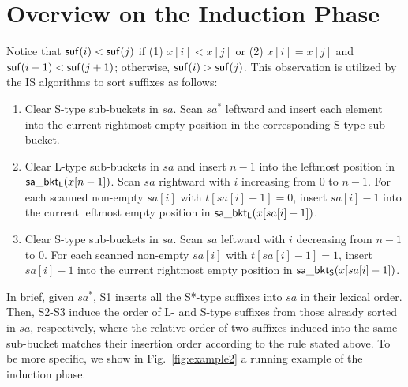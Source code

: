 \documentclass[10pt,journal,compsoc]{IEEEtran}
\begin{document}
\appendices
\section{Overview on the Induction Phase} \label{sec:appendix}

Notice that ${\sf suf}(i) < {\sf suf}(j)$ if (1) $x[i] < x[j]$ or (2) $x[i] = x[j]$ and ${\sf suf}(i + 1) < {\sf suf}(j + 1)$; otherwise, ${\sf suf}(i) > {\sf suf}(j)$. This observation is utilized by the IS algorithms to sort suffixes as follows:

\begin{enumerate}[S1]
	\item 
	Clear S-type sub-buckets in $sa$. Scan $sa^*$ leftward and insert each element into the current rightmost empty position in the corresponding S-type sub-bucket.
	
	\item 
	Clear L-type sub-buckets in $sa$ and insert $n - 1$ into the leftmost position in ${\sf sa\_bkt_L}(x[n - 1])$. Scan $sa$ rightward with $i$ increasing from $0$ to $n - 1$. For each scanned non-empty $sa[i]$ with $t[sa[i] - 1] = 0$, insert $sa[i] - 1$ into the current leftmost empty position in ${\sf sa\_bkt_L}(x[sa[i] - 1])$.
	
	\item
	Clear S-type sub-buckets in $sa$. Scan $sa$ leftward with $i$ decreasing from $n - 1$ to $0$. For each scanned non-empty $sa[i]$ with $t[sa[i] - 1] = 1$, insert $sa[i] - 1$ into the current rightmost empty position in ${\sf sa\_bkt_S}(x[sa[i] - 1])$.
	
\end{enumerate}

In brief, given $sa^*$, S1 inserts all the S*-type suffixes into $sa$ in their lexical order. Then, S2-S3 induce the order of L- and S-type suffixes from those already sorted in $sa$, respectively, where the relative order of two suffixes induced into the same sub-bucket matches their insertion order according to the rule stated above. To be more specific, we show in Fig.~\ref{fig:example2} a running example of the induction phase.
\end{document}
